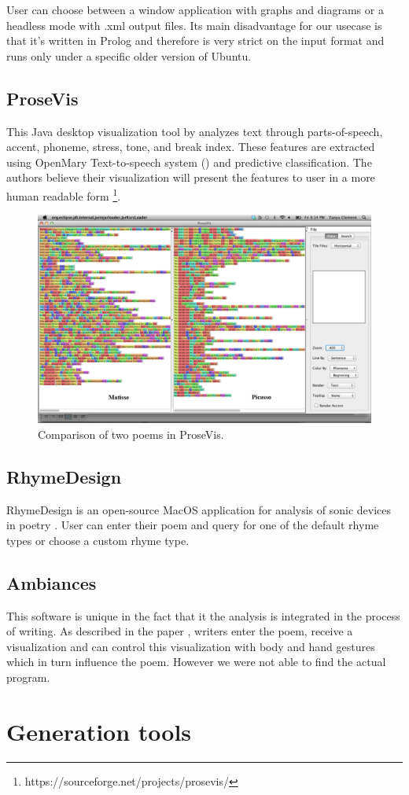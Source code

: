 User can choose between a window application with graphs and diagrams or a headless mode with .xml output files. Its main disadvantage for our usecase is that it's written in Prolog and therefore is very strict on the input format and runs only under a specific older version of Ubuntu. 

\subsection{ProseVis}
This Java desktop visualization tool by \cite{Clement2013} analyzes text through
parts-of-speech, accent, phoneme, stress, tone, and break index. These features are extracted using OpenMary Text-to-speech system (\cite{Schroder2006}) and predictive classification. The authors believe their visualization will present the features to user in a more human readable form \footnote{https://sourceforge.net/projects/prosevis/}.

\begin{figure}[h]\centering
	\includegraphics[scale=0.24]{../img/prosevis.png}
	\caption{Comparison of two poems in ProseVis.}\label{screenshotProsevis}
\end{figure}

\subsection{RhymeDesign}
RhymeDesign is an open-source MacOS application for analysis of sonic devices in poetry \cite{McCurdy2015}. User can enter their poem and query for one of the default rhyme types or choose a custom rhyme type.
\subsection{Ambiances}
This software is unique in the fact that it the analysis is integrated in the process of writing. As described in the paper \cite{Meneses2015}, writers enter the poem, receive a visualization and can control this visualization with body and hand gestures which in turn influence the poem. However we were not able to find the actual program.


\section{Generation tools}
